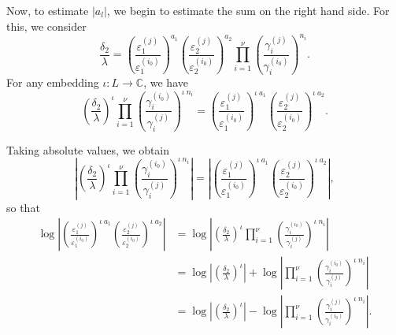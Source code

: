 Now, to estimate $|a_l|$, we begin to estimate the sum on the right hand side. For this, we consider
\[\frac{\delta_2}{\lambda}= \left( \frac{\varepsilon_1^{(j)}}{\varepsilon_1^{(i_0)}}\right)^{a_1}\left( \frac{\varepsilon_2^{(j)}}{\varepsilon_2^{(i_0)}}\right)^{a_2}\prod_{i = 1}^{\nu} \left( \frac{\gamma_i^{(j)}}{\gamma_i^{(i_0)}}\right)^{n_i}.\]
For any embedding $\iota: L \to \mathbb{C}$, we have 
\[\left(\frac{\delta_2}{\lambda}\right)^{\iota} \prod_{i = 1}^{\nu} \left( \frac{\gamma_i^{(i_0)}}{\gamma_i^{(j)}}\right)^{\iota \ n_i} =  \left( \frac{\varepsilon_1^{(j)}}{\varepsilon_1^{(i_0)}}\right)^{\iota \ a_1}\left( \frac{\varepsilon_2^{(j)}}{\varepsilon_2^{(i_0)}}\right)^{\iota \ a_2}.\] 

Taking absolute values, we obtain
\[\left|\left(\frac{\delta_2}{\lambda}\right)^{\iota} \prod_{i = 1}^{\nu} \left( \frac{\gamma_i^{(i_0)}}{\gamma_i^{(j)}}\right)^{\iota \ n_i}\right| = \left|\left( \frac{\varepsilon_1^{(j)}}{\varepsilon_1^{(i_0)}}\right)^{\iota \ a_1}\left( \frac{\varepsilon_2^{(j)}}{\varepsilon_2^{(i_0)}}\right)^{\iota \ a_2}\right|,\]
so that
\begin{align*}
\log\left|\left( \frac{\varepsilon_1^{(j)}}{\varepsilon_1^{(i_0)}}\right)^{\iota \ a_1}\left( \frac{\varepsilon_2^{(j)}}{\varepsilon_2^{(i_0)}}\right)^{\iota \ a_2}\right|
	& = \log\left|\left(\frac{\delta_2}{\lambda}\right)^{\iota} \prod_{i = 1}^{\nu} \left( \frac{\gamma_i^{(i_0)}}{\gamma_i^{(j)}}\right)^{\iota \ n_i}\right|\\
	& = \log\left|\left(\frac{\delta_2}{\lambda}\right)^{\iota}\right| + \log\left| \prod_{i = 1}^{\nu} \left( \frac{\gamma_i^{(i_0)}}{\gamma_i^{(j)}}\right)^{\iota \ n_i}\right|\\
	& = \log\left|\left(\frac{\delta_2}{\lambda}\right)^{\iota}\right| - \log\left| \prod_{i = 1}^{\nu} \left( \frac{\gamma_i^{(j)}}{\gamma_i^{(i_0)}}\right)^{\iota \ n_i}\right|. 
\end{align*}

